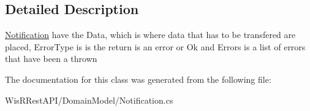 \subsection{Detailed Description}
\hyperlink{class_wis_r_1_1_domain_model_1_1_notification}{Notification} have the Data, which is where data that has to be transfered are placed, Error\+Type is is the return is an error or Ok and Errors is a list of errors that have been a thrown 



The documentation for this class was generated from the following file\+:\begin{DoxyCompactItemize}
\item 
Wis\+R\+Rest\+A\+P\+I/\+Domain\+Model/Notification.\+cs\end{DoxyCompactItemize}
